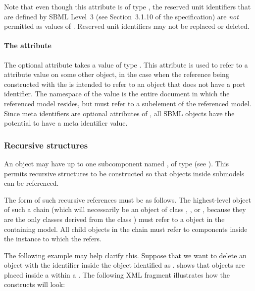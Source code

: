 Note that even though this attribute is of type , the reserved unit identifiers that are defined by SBML Level~3 (see Section~3.1.10 of the \sbmlthreecore specification) are \emph{not} permitted as values of .  Reserved unit identifiers may not be replaced or deleted.


\paragraph{The \fixttspace{} attribute}
\label{sbaseref-metaidref}

The optional attribute  takes a value of type  .  This attribute is used to refer to a  attribute value on some other object, in the case when the reference being constructed with the \SBaseRef is intended to refer to an object that does not have a port identifier.  The namespace of the  value is the entire document in which the referenced model resides, but must refer to a subelement of the referenced model.  Since meta identifiers are optional attributes of \SBase, all SBML objects have the potential to have a meta identifier value.


\subsubsection{Recursive  structures}
\label{sbaseref-recursive-sbaseref}

An \SBaseRef object may have up to one subcomponent named , of type \SBaseRef (see ).  This permits recursive structures to be constructed so that objects inside submodels can be referenced.

The form of such recursive references must be as follows.  The highest-level \SBaseRef object of such a chain (which will necessarily be an object of class \Port, \Deletion, \ReplacedElement or \ReplacedBy, because they are the only classes derived from the class \SBaseRef) must refer to a \Submodel object in the containing model.  All child \SBaseRef objects in the chain must refer to components inside the \Model instance to which the \Submodel refers.

The following example may help clarify this.  Suppose that we want to delete an object with the identifier  inside the \Submodel object identified as .   shows that \Deletion objects are placed inside a \ListOfDeletions within a \Submodel.  The  following XML fragment illustrates how the constructs will look:

